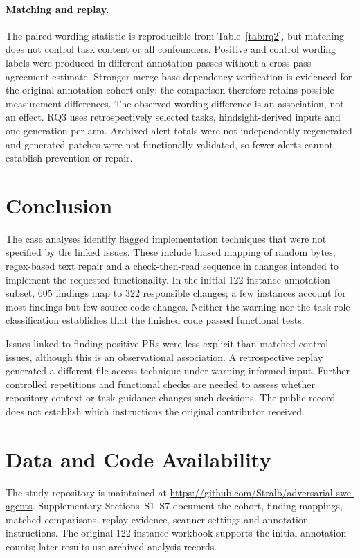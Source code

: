 \documentclass[acmsmall,screen,nonacm]{acmart}
\begin{document}
\paragraph{Matching and replay.} The paired wording statistic is reproducible from Table~\ref{tab:rq2}, but matching does not control task content or all confounders. Positive and control wording labels were produced in different annotation passes without a cross-pass agreement estimate. Stronger merge-base dependency verification is evidenced for the original annotation cohort only; the comparison therefore retains possible measurement differences. The observed wording difference is an association, not an effect. RQ3 uses retrospectively selected tasks, hindsight-derived inputs and one generation per arm. Archived alert totals were not independently regenerated and generated patches were not functionally validated, so fewer alerts cannot establish prevention or repair.

\section{Conclusion}

The case analyses identify flagged implementation techniques that were not specified by the linked issues. These include biased mapping of random bytes, regex-based text repair and a check-then-read sequence in changes intended to implement the requested functionality. In the initial 122-instance annotation subset, 605 findings map to 322 responsible changes; a few instances account for most findings but few source-code changes. Neither the warning nor the task-role classification establishes that the finished code passed functional tests.

Issues linked to finding-positive PRs were less explicit than matched control issues, although this is an observational association. A retrospective replay generated a different file-access technique under warning-informed input. Further controlled repetitions and functional checks are needed to assess whether repository context or task guidance changes such decisions. The public record does not establish which instructions the original contributor received.

\section*{Data and Code Availability}

The study repository is maintained at \url{https://github.com/Stralb/adversarial-swe-agents}. Supplementary Sections~S1--S7 document the cohort, finding mappings, matched comparisons, replay evidence, scanner settings and annotation instructions. The original 122-instance workbook supports the initial annotation counts; later results use archived analysis records.
\end{document}
